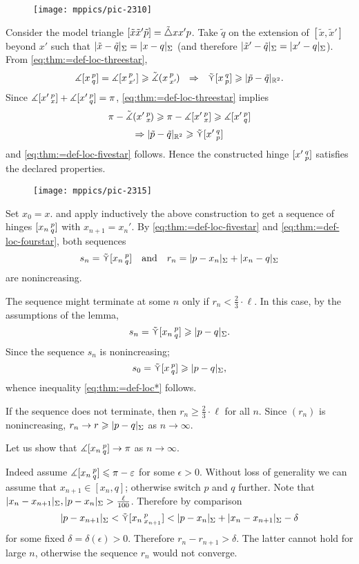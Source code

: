 \begin{wrapfigure}{r}{35mm}
\vskip -4mm
\centering
\texttt{[image: mppics/pic-2310]}
\end{wrapfigure}

Consider the model triangle
$[\tilde x\tilde x'\tilde p]\z=\modtrig xx'p$.
Take $\tilde  q$ on the extension of $[\tilde  x,\tilde  x']$ beyond $x'$ such that $\dist{\tilde x}{\tilde q}\Sigma=\dist{x}{q}\Sigma$ (and therefore $\dist{\tilde x'}{\tilde q}\Sigma=\dist{x'}{q}\Sigma$).
From \ref{eq:thm:=def-loc-threestar},
\[\measuredangle\hinge x p q
=\measuredangle\hinge  x p{x'}\ge\modangle x p{x'}\ \ \Rightarrow\ \ 
\side \hinge x q p\ge\dist{\tilde p}{\tilde q}{\mathbb{R}^2} .\]
Since $\measuredangle[x'\,{}^{p}_{x}]+\measuredangle[x'\,{}^{p}_{q}]= \pi$,
\ref{eq:thm:=def-loc-threestar} implies
\[
\pi
-\tilde\measuredangle(x'\,{}^{p}_{x}\hspace{-0.2ex})
\geqslant
\pi-\measuredangle[x'\,{}^{p}_{x}]
\geqslant
\measuredangle[x'\,{}^{p}_{q}]
\]
\[ \Rightarrow  \dist{\tilde p}{\tilde q}{\mathbb{R}^2}\ge\side \hinge{x'}q p  \]
 and \ref{eq:thm:=def-loc-fivestar} follows.
Hence the constructed hinge $[x'\,{}^{q}_{p}]$ satisfies the declared properties.




\begin{figure}[h!]
\centering
\texttt{[image: mppics/pic-2315]}
\end{figure}

Set $x_0=x$. and apply inductively the above construction to get a sequence of hinges  $[x_n\,{}^{p}_{q}]$ with $x_{n+1}=x_n'$.
By \ref{eq:thm:=def-loc-fivestar} and \ref{eq:thm:=def-loc-fourstar}, both sequences
\[s_n=\side \hinge{x_n}pq\quad\text{and}\quad r_n=\dist{p}{x_n}\Sigma+\dist{x_n}{q}\Sigma\]
are nonincreasing.

The sequence might terminate at some $n$ only if $r_n< \tfrac{2}{3}\cdot\ell $.
In this case, by the assumptions of the lemma, 
\[s_n=\side \hinge{x_n}p q\ge\dist{p}{q}\Sigma.\]
Since the sequence $s_n$ is nonincreasing;
\[s_0=\side \hinge{x}p q\ge\dist{p}{q}\Sigma,\]
whence inequality \ref{eq:thm:=def-loc*} follows.

If the sequence does not terminate, then $r_n\ge\tfrac{2}{3}\cdot\ell$ for all $n$.
Since $(r_n)$ is nonincreasing, $r_n\to r\ge \dist{p}{q}\Sigma$ as $n\to\infty$.

Let us show that $\measuredangle[x_n\,{}^{p}_{q}]\to \pi$ as $n\to\infty$.

Indeed assume $\measuredangle[x_n\,{}^{p}_{q}]\leqslant \pi-\varepsilon$ for some $\epsilon>0$.
Without loss of generality we can assume that $x_{n+1}\in [x_n,q]$;
otherwise switch $p$ and $q$ further.
Note that $\dist{x_n}{x_{n+1}}\Sigma,\dist{p}{x_n}\Sigma>\tfrac\ell{100}$.
Therefore by comparison 
\[\dist{p}{x_{n+1}}\Sigma<\side\hinge{x_n}p{x_{n+1}}<\dist{p}{x_n}\Sigma+\dist{x_n}{x_{n+1}}\Sigma-\delta\]
for some fixed $\delta=\delta(\epsilon)>0$.
Therefore $r_n-r_{n+1}>\delta$.
The latter cannot hold for large $n$, otherwise the sequence $r_n$ would not converge.

